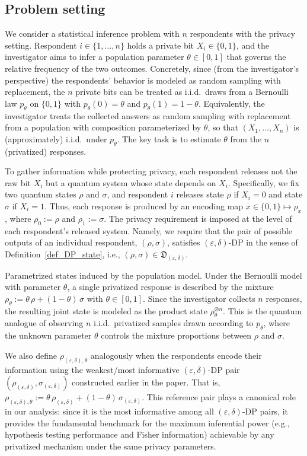 \documentclass[onecolumn,ldraftcls, 11pt]{IEEEtran}
\newcommand{\eps}{\varepsilon}
\begin{document}
\subsection{Problem setting}
We consider a statistical inference problem with $n$ respondents with the privacy setting.
Respondent $i\in\{1,\ldots,n\}$ holds a private bit $X_i\in\{0,1\}$, and the investigator aims to infer a population parameter
$\theta\in[0,1]$ that governs the relative frequency of the two outcomes.
Concretely, since (from the investigator’s perspective) the respondents’ behavior is modeled as random sampling with replacement, the $n$ private bits can be treated as i.i.d.\ draws from a Bernoulli law $p_\theta$ on $\{0,1\}$ with $p_\theta(0)=\theta$ and $p_\theta(1)=1-\theta$.
Equivalently, the investigator treats the collected answers as random sampling with replacement from a population with
composition parameterized by $\theta$, so that $(X_1,\ldots,X_n)$ is (approximately) i.i.d.\ under $p_\theta$.
The key task is to estimate $\theta$ from the $n$ (privatized) responses.

To gather information while protecting privacy, each respondent releases not the raw bit $X_i$ but a quantum system whose
state depends on $X_i$.
Specifically, we fix two quantum states $\rho$ and $\sigma$, and respondent $i$ releases state $\rho$ if $X_i=0$ and state
$\sigma$ if $X_i=1$.
Thus, each response is produced by an encoding map $x\in\{0,1\}\mapsto \rho_x$, where $\rho_0:=\rho$ and
$\rho_1:=\sigma$.
The privacy requirement is imposed at the level of each respondent's released system.
Namely, we require that the pair of possible outputs of an individual respondent, $(\rho,\sigma)$, satisfies
$(\eps,\delta)$-DP in the sense of Definition~\ref{def_DP_state}, i.e.,
$(\rho,\sigma)\in\mathfrak{D}_{(\varepsilon,\delta)}$.

Parametrized states induced by the population model.
Under the Bernoulli model with parameter $\theta$, a single privatized response is described by the mixture
$\rho_\theta := \theta\,\rho + (1-\theta)\,\sigma$ with $\theta\in[0,1]$.
Since the investigator collects $n$ responses, the resulting joint state is modeled as the product state
$\rho_\theta^{\otimes n}$.
This is the quantum analogue of observing $n$ i.i.d.\ privatized samples drawn according to $p_\theta$, where the unknown
parameter $\theta$ controls the mixture proportions between $\rho$ and $\sigma$.

We also define $\rho_{(\eps,\delta),\theta}$ analogously when the respondents encode their information using the weakest/most
informative $(\eps,\delta)$-DP pair $(\rho_{(\eps,\delta)},\sigma_{(\eps,\delta)})$ constructed earlier in the paper.
That is,
$\rho_{(\eps,\delta),\theta} := \theta\,\rho_{(\eps,\delta)} + (1-\theta)\,\sigma_{(\eps,\delta)}$.
This reference pair plays a canonical role in our analysis: since it is the most informative among all $(\eps,\delta)$-DP
pairs, it provides the fundamental benchmark for the maximum inferential power (e.g., hypothesis testing performance and
Fisher information) achievable by any privatized mechanism under the same privacy parameters.
\end{document}
